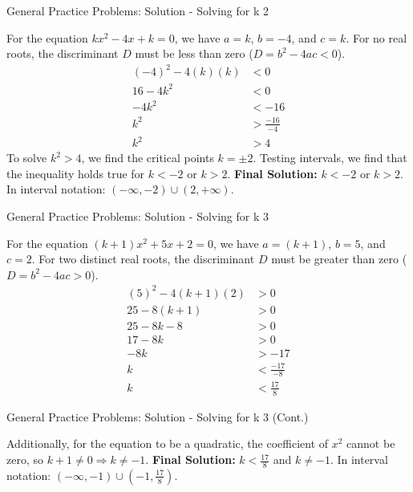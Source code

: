 \documentclass[aspectratio=169]{beamer}
\begin{document}
\begin{frame}{General Practice Problems: Solution - Solving for k 2}
    \begin{tcolorbox}[colback=lightgray,colframe=accent,title=Solution: $kx^2 - 4x + k = 0$ (No Real Roots)]
        \footnotesize
        For the equation $kx^2 - 4x + k = 0$, we have $a=k$, $b=-4$, and $c=k$.
        For no real roots, the discriminant $D$ must be less than zero ($D=b^2-4ac<0$).
        \begin{align*}
            (-4)^2 - 4(k)(k) &< 0 \\
            16 - 4k^2 &< 0 \\
            -4k^2 &< -16 \\
            k^2 &> \frac{-16}{-4} \\
            k^2 &> 4
        \end{align*}
        To solve $k^2 > 4$, we find the critical points $k=\pm 2$.
        Testing intervals, we find that the inequality holds true for $k < -2$ or $k > 2$.
        \textbf{Final Solution:} $k < -2$ or $k > 2$.
        \newline
        In interval notation: $(-\infty, -2) \cup (2, +\infty)$.
    \end{tcolorbox}
\end{frame}

\begin{frame}{General Practice Problems: Solution - Solving for k 3}
    \begin{tcolorbox}[colback=lightgray,colframe=accent,title=Solution: $(k+1)x^2 + 5x + 2 = 0$ (Two Distinct Real Roots)]
        \footnotesize
        For the equation $(k+1)x^2 + 5x + 2 = 0$, we have $a=(k+1)$, $b=5$, and $c=2$.
        For two distinct real roots, the discriminant $D$ must be greater than zero ($D=b^2-4ac>0$).
        \begin{align*}
            (5)^2 - 4(k+1)(2) &> 0 \\
            25 - 8(k+1) &> 0 \\
            25 - 8k - 8 &> 0 \\
            17 - 8k &> 0 \\
            -8k &> -17 \\
            k &< \frac{-17}{-8} \\
            k &< \frac{17}{8}
        \end{align*}
    \end{tcolorbox}
\end{frame}

\begin{frame}{General Practice Problems: Solution - Solving for k 3 (Cont.)}
    \begin{tcolorbox}[colback=lightgray,colframe=accent,title=Solution: $(k+1)x^2 + 5x + 2 = 0$ (Cont.)]
        \footnotesize
        Additionally, for the equation to be a quadratic, the coefficient of $x^2$ cannot be zero, so $k+1 \neq 0 \Rightarrow k \neq -1$.
        \newline
        \textbf{Final Solution:} $k < \frac{17}{8}$ and $k \neq -1$.
        \newline
        In interval notation: $(-\infty, -1) \cup (-1, \frac{17}{8})$.
    \end{tcolorbox}
\end{frame}
\end{document}
